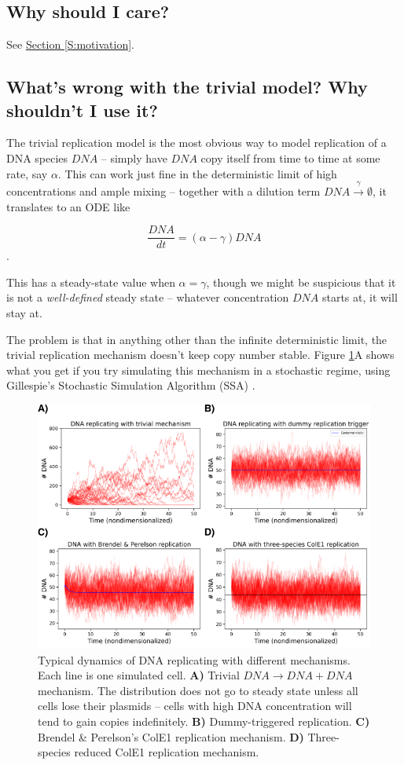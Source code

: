 \documentclass[preprint,12pt]{oldplainarticle}
\begin{document}
\subsection{Why should I care?}

	See \hyperref[S:motivation]{Section \ref{S:motivation}}.

\subsection{What's wrong with the trivial model? Why shouldn't I use it?}

The trivial replication model is the most obvious way to model replication of a DNA species $DNA$ -- simply have $DNA$ copy itself from time to time at some rate, say $\alpha$. This can work just fine in the deterministic limit of high concentrations and ample mixing -- together with a dilution term $DNA \overset{\gamma}{\to} \emptyset$, it translates to an ODE like 

$$\frac{DNA}{dt} = (\alpha - \gamma) DNA$$.

This has a steady-state value when $\alpha = \gamma$, though we might be suspicious that it is not a \emph{well-defined} steady state -- whatever concentration $DNA$ starts at, it will stay at. 

The problem is that in anything other than the infinite deterministic limit, the trivial replication mechanism doesn't keep copy number stable. Figure \ref{fig:model_trajectories}A shows what you get if you try simulating this mechanism in a stochastic regime, using Gillespie's Stochastic Simulation Algorithm (SSA) \cite{Gillespie1977}.

\begin{figure}[!ht]
\includegraphics[width=5in]{figures/good_rep_trajectories.png}
\caption{Typical dynamics of DNA replicating with different mechanisms. Each line is one simulated cell. \textbf{A)} Trivial $DNA \to DNA + DNA$ mechanism. The distribution does not go to steady state unless all cells lose their plasmids -- cells with high DNA concentration will tend to gain copies indefinitely. \textbf{B)} Dummy-triggered replication. \textbf{C)} Brendel \& Perelson's ColE1 replication mechanism. \textbf{D)} Three-species reduced ColE1 replication mechanism.}
\label{fig:model_trajectories}
\end{figure}
\end{document}
